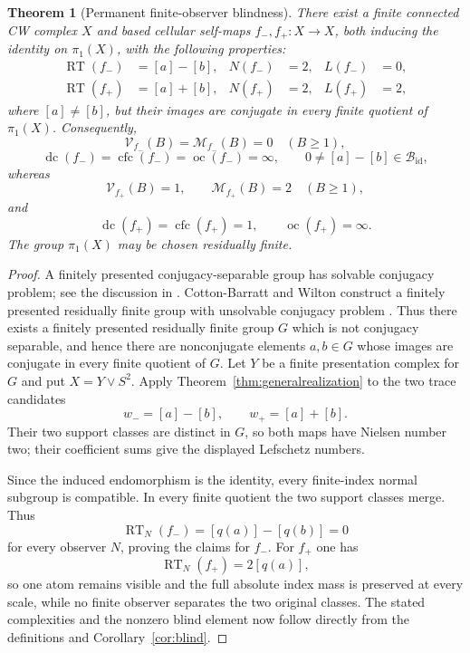 \documentclass[11pt]{article}
\newtheorem{theorem}{Theorem}[section]
\DeclareMathOperator{\oc}{oc}
\DeclareMathOperator{\dc}{dc}
\DeclareMathOperator{\cfc}{cfc}
\DeclareMathOperator{\id}{id}
\newcommand{\RT}{\operatorname{RT}}
\newcommand{\VN}{\mathcal V}
\newcommand{\MN}{\mathcal M}
\begin{document}
\begin{theorem}[Permanent finite-observer blindness]
\label{thm:permanentblindness}
There exist a finite connected CW complex $X$ and based cellular self-maps
$f_-,f_+\colon X\to X$, both inducing the identity on $\pi_1(X)$, with the
following properties:
\begin{align*}
  \RT(f_-)&=[a]-[b],&
  N(f_-)&=2,& L(f_-)&=0,\\
  \RT(f_+)&=[a]+[b],&
  N(f_+)&=2,& L(f_+)&=2,
\end{align*}
where $[a]\ne[b]$, but their images are conjugate in every finite quotient of
$\pi_1(X)$.  Consequently,
\[
  \VN_{f_-}(B)=\MN_{f_-}(B)=0
  \quad(B\ge1),
\]
\[
  \dc(f_-)=\cfc(f_-)=\oc(f_-)=\infty,
  \qquad
  0\ne[a]-[b]\in\mathcal B_{\id},
\]
whereas
\[
  \VN_{f_+}(B)=1,\qquad \MN_{f_+}(B)=2
  \quad(B\ge1),
\]
and
\[
  \dc(f_+)=\cfc(f_+)=1,
  \qquad
  \oc(f_+)=\infty.
\]
The group $\pi_1(X)$ may be chosen residually finite.
\end{theorem}

\begin{proof}
A finitely presented conjugacy-separable group has solvable conjugacy
problem; see the discussion in \cite{BogopolskiGrunewald}.  Cotton-Barratt
and Wilton construct a finitely presented residually finite group with
unsolvable conjugacy problem \cite{CottonBarrattWilton}.  Thus there exists
a finitely presented residually finite group $G$ which is not conjugacy
separable, and hence there are nonconjugate elements $a,b\in G$ whose images
are conjugate in every finite quotient of $G$.  Let $Y$ be a finite presentation complex for $G$ and put
$X=Y\vee S^2$.  Apply Theorem~\ref{thm:generalrealization} to the two trace
candidates
\[
  w_-=[a]-[b],
  \qquad
  w_+=[a]+[b].
\]
Their two support classes are distinct in $G$, so both maps have Nielsen
number two; their coefficient sums give the displayed Lefschetz numbers.

Since the induced endomorphism is the identity, every finite-index normal
subgroup is compatible.  In every finite quotient the two support classes
merge.  Thus
\[
  \RT_N(f_-)=[q(a)]-[q(b)]=0
\]
for every observer $N$, proving the claims for $f_-$.  For $f_+$ one has
\[
  \RT_N(f_+)=2[q(a)],
\]
so one atom remains visible and the full absolute index mass is preserved at
every scale, while no finite observer separates the two original classes.
The stated complexities and the nonzero blind element now follow directly
from the definitions and Corollary~\ref{cor:blind}.
\end{proof}
\end{document}
